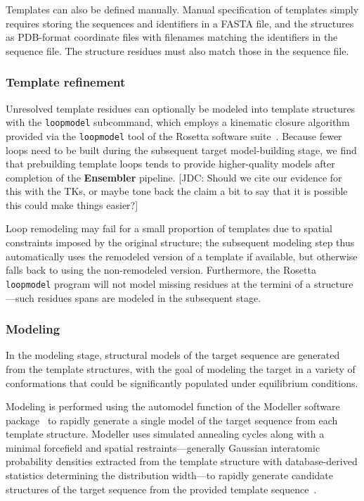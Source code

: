 \documentclass[aps,pre,twocolumn,nofootinbib,superscriptaddress,linenumbers]{revtex4-1}
\begin{document}
Templates can also be defined manually.
Manual specification of templates simply requires storing the sequences and identifiers in a FASTA file, and the structures as PDB-format coordinate files with filenames matching the identifiers in the sequence file.
The structure residues must also match those in the sequence file.

\subsubsection*{Template refinement}

Unresolved template residues can optionally be modeled into template structures with the {\tt loopmodel} subcommand, which employs a kinematic closure algorithm provided via the {\tt loopmodel} tool of the Rosetta software suite~\cite{qian:nature:2007:modeller,wang:jmb:2007:modeller}.
Because fewer loops need to be built during the subsequent target model-building stage, we find that prebuilding template loops tends to provide higher-quality models after completion of the {\bf Ensembler} pipeline.
{\color{red}[JDC: Should we cite our evidence for this with the TKs, or maybe tone back the claim a bit to say that it is possible this could make things easier?]}

Loop remodeling may fail for a small proportion of templates due to spatial constraints imposed by the original structure; the subsequent modeling step thus automatically uses the remodeled version of a template if available, but otherwise falls back to using the non-remodeled version.
Furthermore, the Rosetta {\tt loopmodel} program will not model missing residues at the termini of a structure---such residues spans are modeled in the subsequent stage.

\subsubsection*{Modeling}

In the modeling stage, structural models of the target sequence are generated from the template structures, with the goal of modeling the target in a variety of conformations that could be significantly populated under equilibrium conditions.

Modeling is performed using the automodel function of the Modeller software package~\cite{fiser:prot-sci:2000:modeller,sali:jmb:1993:modeller} to rapidly generate a single model of the target sequence from each template structure.
Modeller uses simulated annealing cycles along with a minimal forcefield and spatial restraints---generally Gaussian interatomic probability densities extracted from the template structure with database-derived statistics determining the distribution width---to rapidly generate candidate structures of the target sequence from the provided template sequence~\cite{fiser:prot-sci:2000:modeller,sali:jmb:1993:modeller}.
\end{document}
